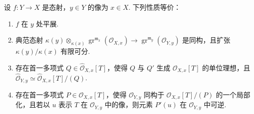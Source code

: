 \begin{proposition}\label{item:ag-3-3-11}
设 $f:Y\longrightarrow X$ 是态射，$y\in Y$ 的像为 $x\in X$. 下列性质等价：
\begin{enumerate}[label=\roman*)]
\item $f$ 在 $y$ 处平展.
\item 典范态射 $\kappa(y)\otimes_{\kappa(x)}\operatorname{gr}^{\mathfrak m_x}(\mathcal O_{X,x})\longrightarrow\operatorname{gr}^{\mathfrak m_y}(\mathcal O_{Y,y})$ 是同构，且扩张 $\kappa(y)/\kappa(x)$ 有限可分.
\item 存在首一多项式 $Q\in\widehat{\mathcal O}_{X,x}[T]$，使得 $Q$ 与 $Q'$ 生成 $\mathcal O_{X,x}[T]$ 的单位理想，且 $\widehat{\mathcal O}_{Y,y}\simeq\widehat{\mathcal O}_{X,x}[T]/(Q)$.
\item 存在首一多项式 $P\in\mathcal O_{X,x}[T]$，使得 $\mathcal O_{Y,y}$ 同构于 $\mathcal O_{X,x}[T]/(P)$ 的一个局部化，且若以 $u$ 表示 $T$ 在 $\mathcal O_{Y,y}$ 中的像，则元素 $P'(u)$ 在 $\mathcal O_{Y,y}$ 中可逆.
\end{enumerate}
\end{proposition}
